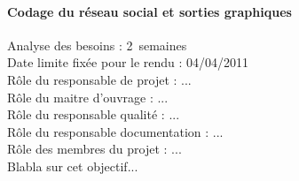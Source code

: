 \paragraph*{Codage du réseau social et sorties graphiques\\}
Analyse des besoins : 2~semaines\\
Date limite fixée pour le rendu : 04/04/2011\\
Rôle du responsable de projet : ...\\
Rôle du maitre d'ouvrage : ...\\
Rôle du responsable qualité : ...\\
Rôle du responsable documentation : ...\\
Rôle des membres du projet : ...\\
Blabla sur cet objectif...

